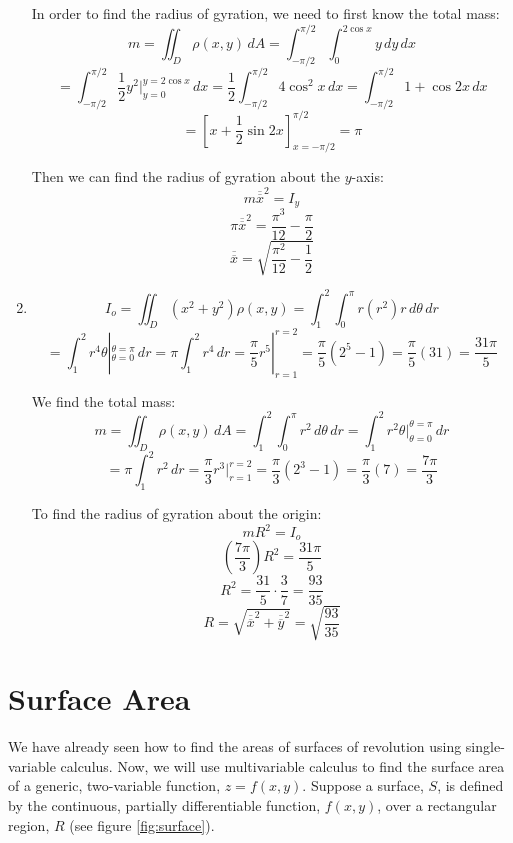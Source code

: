 \begin{Answer}[ref = moment]
\begin{enumerate}
In order to find the radius of gyration, we need to first know the total mass:
$$m = \iint_{\textit{D}} \rho(x, y)\,dA = \int_{-\pi/2}^{\pi/2} \int_{0}^{2
\cos{x}} y \,dy\,dx$$
$$= \int_{-\pi/2}^{\pi/2} \frac{1}{2}y^2|_{y = 0}^{y = 2\cos{x}}\,dx = 
\frac{1}{2} \int_{-\pi/2}^{\pi/2} 4\cos^2{x}\,dx = \int_{-\pi/2}^{\pi/2} 1 + 
\cos{2x}\,dx$$
$$= \left[x + \frac{1}{2}\sin{2x} \right]_{x = -\pi/2}^{\pi/2} = \pi$$

Then we can find the radius of gyration about the $y$-axis:
$$m \overline{\overline{x}}^2 = I_y$$
$$\pi \overline{\overline{x}}^2 = \frac{\pi^3}{12} - \frac{\pi}{2}$$
$$\overline{\overline{x}} = \sqrt{\frac{\pi^2}{12} - \frac{1}{2}}$$

\item $$I_o = \iint_{\textit{D}} \left( x^2 + y^2 \right) \rho(x, y) = \int_1^2
\int_0^{\pi} r (r^2) r \,d\theta \,dr$$
$$= \int_1^2 r^4 \theta|_{\theta = 0}^{\theta = \pi}\,dr = \pi \int_1^2 r^4\,dr
= \frac{\pi}{5} r^5|_{r = 1}^{r = 2} = \frac{\pi}{5} \left(2^5 - 1 \right) = 
\frac{\pi}{5} (31) = \frac{31\pi}{5}$$

We find the total mass:
$$m = \iint_{\textit{D}} \rho(x,y)\,dA = \int_1^2 \int_0^{\pi} r^2\,d\theta\,dr
= \int_1^2 r^2 \theta|_{\theta = 0}^{\theta = \pi}\,dr$$
$$= \pi \int_1^2 r^2\,dr = \frac{\pi}{3} r^3|_{r = 1}^{r = 2} = \frac{\pi}{3} 
\left(2^3 - 1 \right) = \frac{\pi}{3}(7) = \frac{7\pi}{3}$$

To find the radius of gyration about the origin:
$$mR^2 = I_o$$
$$\left( \frac{7\pi}{3} \right) R^2 = \frac{31\pi}{5}$$
$$R^2 = \frac{31}{5} \cdot \frac{3}{7} = \frac{93}{35}$$
$$R = \sqrt{\overline{\overline{x}}^2 + \overline{\overline{y}}^2} = \sqrt{
\frac{93}{35}}$$
\end{enumerate}
\end{Answer}

\section{Surface Area}
We have already seen how to find the areas of surfaces of revolution using 
single-variable calculus. Now, we will use multivariable calculus to find the 
surface area of a generic, two-variable function, $z = f(x, y)$. Suppose a 
surface, $S$, is defined by the continuous, partially differentiable function, 
$f(x, y)$, over a rectangular region, $R$ (see figure \ref{fig:surface}). 

